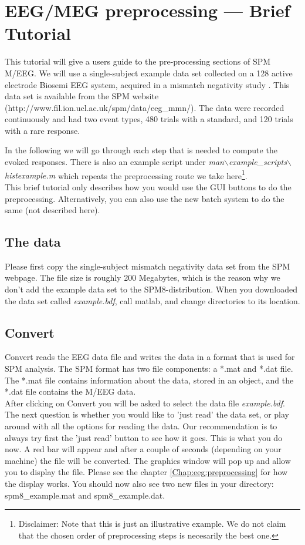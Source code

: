 \chapter{EEG/MEG preprocessing --- Brief Tutorial \label{ch:eeg_tutorial}}

This tutorial will give a users guide to the pre-processing sections
of SPM M/EEG. We will use a single-subject example data set collected on a 128 active
electrode Biosemi EEG system, acquired in a mismatch negativity study \cite{mg_dcm_repro}. This data set is available from the SPM website (http://www.fil.ion.ucl.ac.uk/spm/data/eeg\_mmn/). The data were recorded continuously and had two event types, 480 trials with a standard, and 120 trials with a rare response.

In the following we will go through each step that is needed to compute the evoked responses. There is also an example script under \textit{man$\backslash$example\_scripts$\backslash$histexample.m} which repeats the preprocessing route we take here\footnote{Disclaimer: Note that this is just an illustrative example. We do not claim that the chosen order of preprocessing steps is necesarily the best one.}.
\\
This brief tutorial only describes how you would use the GUI buttons to do the preprocessing. Alternatively, you can also use the new batch system to do the same (not described here).

\section{The data}
Please first copy the single-subject mismatch negativity data set from the SPM webpage. The file size is roughly 200 Megabytes, which is the reason why we don't add the example data set to the SPM8-distribution. When you downloaded the data set called \textit{example.bdf}, call matlab, and change directories to its location.

\section{Convert}
Convert reads the EEG data file and writes the data in a format that
is used for SPM analysis. The SPM format has two file components: a *.mat
and *.dat file. The *.mat file contains information about the data, stored in an object, and the *.dat file contains the M/EEG data.\\

After clicking on Convert you will be asked to select the data file \textit{example.bdf}. The next question is whether you would like to 'just read' the data set, or play around with all the options for reading the data. Our recommendation is to always try first the 'just read' button to see how it goes. This is what you do now. A red bar will appear and after a couple of seconds (depending on your machine) the file will be converted. The graphics window will pop up and allow you to display the file. Please see the chapter \ref{Chap:eeg:preprocessing} for how the display works. You should now also see two new files in your directory: spm8\_example.mat and spm8\_example.dat.


